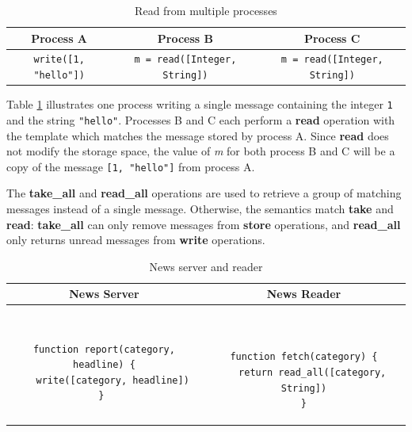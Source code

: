 \documentclass[lnicst]{svmultln}
\begin{document}
\begin{table}
\centering
\caption{Read from multiple processes}
\begin{tabular}{|c|c|c|} \hline
\textbf{Process A} & \textbf{Process B} & \textbf{Process C} \\ \hline
\texttt{write([1, "hello"])} & \texttt{m = read([Integer, String])} & \texttt{m = read([Integer, String])} \\ \hline
\end{tabular}
\label{fig:readprocesses}
\end{table}

Table \ref{fig:readprocesses} illustrates one process writing a single message containing the integer \texttt{1} and the string \texttt{"hello"}. Processes B and C each perform a \textbf{read} operation with the template which matches the message stored by process A. Since \textbf{read} does not modify the storage space, the value of \textit{m} for both process B and C will be a copy of the message \texttt{[1, "hello"]} from process A.

The \textbf{take\_all} and \textbf{read\_all} operations are used to retrieve a group of matching messages instead of a single message. Otherwise, the semantics match \textbf{take} and \textbf{read}: \textbf{take\_all} can only remove messages from \textbf{store} operations, and \textbf{read\_all} only returns unread messages from \textbf{write} operations.

\begin{table}
\centering
\caption{News server and reader}
\begin{tabular}{|c|c|} \hline
\textbf{News Server} & \textbf{News Reader} \\ \hline
\begin{minipage}{2.45in}
\begin{verbatim}

function report(category, headline) {
   write([category, headline])
} 
\end{verbatim}
\end{minipage}
&
\begin{minipage}{2.5in}
\begin{verbatim}


function fetch(category) {
   return read_all([category, String])
}
\end{verbatim}
\end{minipage}
\\ \hline
\end{tabular}
\label{fig:newsreader}
\end{table}
\end{document}
